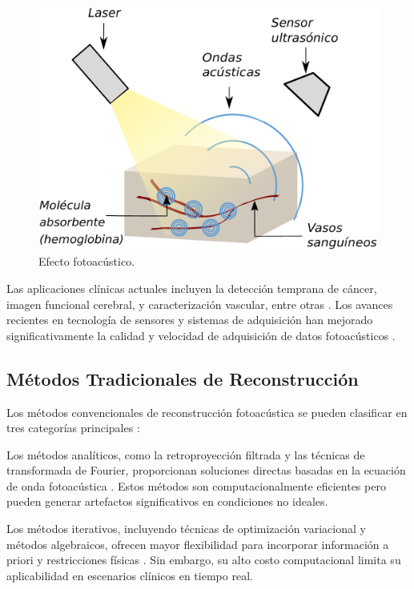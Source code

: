\begin{figure}[H]
    \centering
    \includegraphics[width=\textwidth]{Images/effect.pdf}
    \caption{Efecto fotoacústico.}
    \label{fig:efecto_fotoacustico}
\end{figure}

Las aplicaciones clínicas actuales incluyen la detección temprana de cáncer, imagen funcional cerebral, y caracterización vascular, entre otras \cite{kim2021clinical}. Los avances recientes en tecnología de sensores y sistemas de adquisición han mejorado significativamente la calidad y velocidad de adquisición de datos fotoacústicos \cite{zhang2020advances}.
\subsection{Métodos Tradicionales de Reconstrucción} \label{sec:lit:first:two}
Los métodos convencionales de reconstrucción fotoacústica se pueden clasificar en tres categorías principales \cite{kuchment2008mathematics}:

Los métodos analíticos, como la retroproyección filtrada y las técnicas de transformada de Fourier, proporcionan soluciones directas basadas en la ecuación de onda fotoacústica \cite{xu2005universal}. Estos métodos son computacionalmente eficientes pero pueden generar artefactos significativos en condiciones no ideales.

Los métodos iterativos, incluyendo técnicas de optimización variacional y métodos algebraicos, ofrecen mayor flexibilidad para incorporar información a priori y restricciones físicas \cite{huang2013full}. Sin embargo, su alto costo computacional limita su aplicabilidad en escenarios clínicos en tiempo real.

